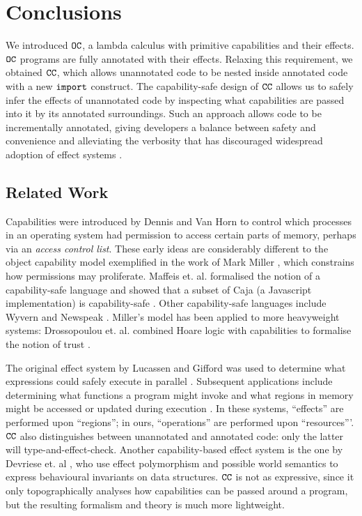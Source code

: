 \section{Conclusions}

We introduced $\mathtt{OC}$, a lambda calculus with primitive capabilities and their effects. $\mathtt{OC}$ programs are fully annotated with their effects. Relaxing this requirement, we obtained $\mathtt{CC}$, which allows unannotated code to be nested inside annotated code with a new $\mathtt{import}$ construct. The capability-safe design of $\mathtt{CC}$ allows us to safely infer the effects of unannotated code by inspecting what capabilities are passed into it by its annotated surroundings. Such an approach allows code to be incrementally annotated, giving developers a balance between safety and convenience and alleviating the verbosity that has discouraged widespread adoption of effect systems \cite{rytz12}.

\subsection{Related Work}

Capabilities were introduced by Dennis and Van Horn \cite{dennis66} to control which processes in an operating system had permission to access certain parts of memory, perhaps via an \textit{access control list}. These early ideas are considerably different to the object capability model exemplified in the work of Mark Miller \cite{miller06}, which constrains how permissions may proliferate. Maffeis et. al. formalised the notion of a capability-safe language and showed that a subset of Caja (a Javascript implementation) is capability-safe \cite{maffeis10}. Other capability-safe languages include Wyvern \cite{nistor13} and Newspeak \cite{bracha10}. Miller's model has been applied to more heavyweight systems: Drossopoulou et. al. combined Hoare logic with capabilities to formalise the notion of trust \cite{drossopoulou07}.

The original effect system by Lucassen and Gifford was used to determine what expressions could safely execute in parallel \cite{lucassen88}. Subsequent applications include determining what functions a program might invoke \cite{tang94} and what regions in memory might be accessed or updated during execution \cite{talpin94}. In these systems, ``effects'' are performed upon ``regions''; in ours, ``operations'' are performed upon ``resources'''. $\mathtt{CC}$ also distinguishes between unannotated and annotated code: only the latter will type-and-effect-check. Another capability-based effect system is the one by Devriese et. al \cite{devriese16}, who use effect polymorphism and possible world semantics to express behavioural invariants on data structures. $\mathtt{CC}$ is not as expressive, since it only topographically analyses how capabilities can be passed around a program, but the resulting formalism and theory is much more lightweight.

